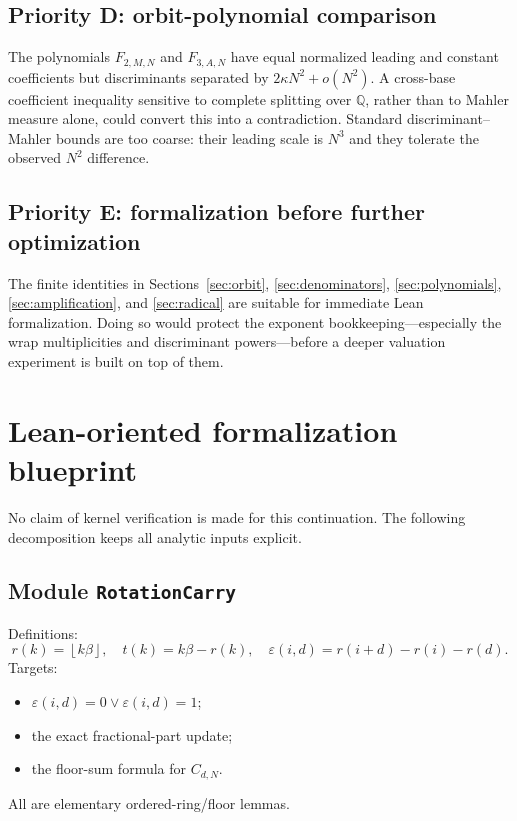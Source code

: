 \documentclass[11pt,oneside]{article}
\theoremstyle{definition}
\theoremstyle{remark}
\newcommand{\Q}{\mathbb Q}
\newcommand{\floor}[1]{\left\lfloor #1\right\rfloor}
\begin{document}
\subsection{Priority D: orbit-polynomial comparison}

The polynomials $F_{2,M,N}$ and $F_{3,A,N}$ have equal normalized leading and constant
coefficients but discriminants separated by $2\kappa N^2+o(N^2)$.  A cross-base coefficient
inequality sensitive to complete splitting over $\Q$, rather than to Mahler measure alone,
could convert this into a contradiction.  Standard discriminant--Mahler bounds are too coarse:
their leading scale is $N^3$ and they tolerate the observed $N^2$ difference.

\subsection{Priority E: formalization before further optimization}

The finite identities in Sections~\ref{sec:orbit}, \ref{sec:denominators},
\ref{sec:polynomials}, \ref{sec:amplification}, and \ref{sec:radical} are suitable for immediate
Lean formalization.  Doing so would protect the exponent bookkeeping---especially the wrap
multiplicities and discriminant powers---before a deeper valuation experiment is built on top
of them.

\section{Lean-oriented formalization blueprint}
\label{sec:lean}

No claim of kernel verification is made for this continuation.  The following decomposition
keeps all analytic inputs explicit.

\subsection{Module \texttt{RotationCarry}}

Definitions:
\[
 r(k)=\floor{k\beta},\quad t(k)=k\beta-r(k),\quad
 \varepsilon(i,d)=r(i+d)-r(i)-r(d).
\]
Targets:
\begin{itemize}
\item $\varepsilon(i,d)=0\lor\varepsilon(i,d)=1$;
\item the exact fractional-part update;
\item the floor-sum formula for $C_{d,N}$.
\end{itemize}
All are elementary ordered-ring/floor lemmas.
\end{document}
